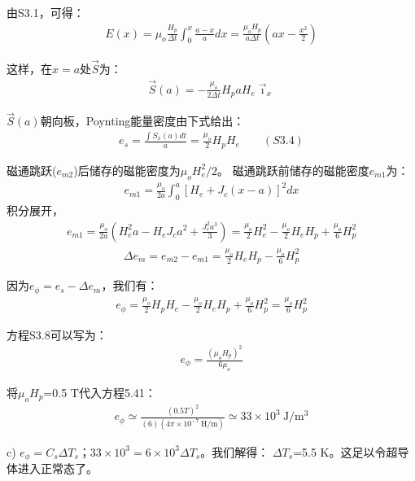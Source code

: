 由S3.1，可得：
\begin{align*}%
E(x)=\mu_{o}\frac{H_{p}}{\Delta t}\int_{0}^{x}\frac{a-x}{a}dx=\frac{\mu_{o}H_{p}}{a\Delta t}(ax-\frac{x^{2}}{2})\tag{S3.2}
\end{align*}

这样，在$x=a$处$\vec{S}$为：
\begin{align*}%
\vec{S}(a)=-\frac{\mu_{o}}{2\Delta t}H_{p}aH_{e}\vec{\imath}_{x}\tag{S3.3}
\end{align*}

$\vec{S}(a)$朝向板，Poynting能量密度由下式给出：
\begin{align*}%
e_{s}=\frac{\int S_{x}(a)dt}{a}=\frac{\mu_{o}}{2}H_{p}H_{e}\qquad(S3.4)
\end{align*}

磁通跳跃($e_{m2}$)后储存的磁能密度为$\mu_o H_e^2/2$。
磁通跳跃前储存的磁能密度$e_{m1}$为： 
\begin{align*}%
e_{m1}=\frac{\mu_{o}}{2a}\int_{0}^{a}[H_{e}+J_{c}(x-a)]^{2}dx\tag{S3.5}
\end{align*}
积分展开，
\begin{align*}%
e_{m1}=\frac{\mu_{o}}{2a}(H_{e}^{2}a-H_{e}J_{c}a^{2}+\frac{J_{c}^{2}a^{3}}{3})=\frac{\mu_{o}}{2}H_{e}^{2}-\frac{\mu_{o}}{2}H_{e}H_{p}+\frac{\mu_{o}}{6}H_{p}^{2}\tag{S3.6}
\end{align*}
\begin{align*}%
\Delta e_{m}=e_{m2}-e_{m1}=\frac{\mu_{o}}{2}H_{e}H_{p}-\frac{\mu_{o}}{6}H_{p}^{2}\tag{S3.7}
\end{align*}

因为$e_\phi=e_s-\Delta e_m$，我们有：
\begin{align*}%
e_{\phi}=\frac{\mu_{o}}{2}H_{p}H_{e}-\frac{\mu_{o}}{2}H_{e}H_{p}+\frac{\mu_{o}}{6}H_{p}^{2}=\frac{\mu_{o}}{6}H_{p}^{2}\tag{S3.8}
\end{align*}

方程S3.8可以写为：
\begin{align*}%
e_{\phi}=\frac{(\mu_{o}H_{p})^{2}}{6\mu_{o}}\tag{5.41}
\end{align*}

将$\mu_o H_p$=0.5 T代入方程5.41：
\begin{align*}%
e_{\phi}\simeq\frac{(0.5T)^{2}}{(6)(4\pi\times10^{-7}\ \mathrm{H/m})}\simeq33\times10^{3}\ \mathrm{J/m^{3}}
\end{align*}

c) $e_\phi = C_s \Delta T_s；33\times 10^3= 6\times 10^3 \Delta T_s$。我们解得：
$\Delta T_s$=5.5 K。这足以令超导体进入正常态了。


